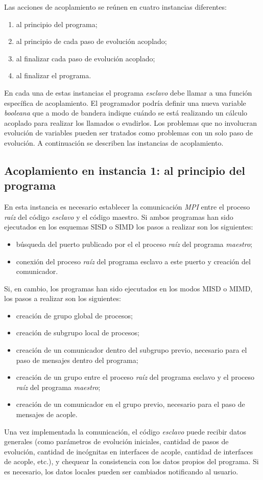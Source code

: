 Las acciones de acoplamiento se reúnen en cuatro instancias diferentes:
\begin{enumerate}
\item al principio del programa;
\item al principio de cada paso de evolución acoplado;
\item al finalizar cada paso de evolución acoplado;
\item al finalizar el programa.
\end{enumerate}
En cada una de estas instancias el programa \textit{esclavo} debe llamar a una función específica de acoplamiento.
El programador podría definir una nueva variable \textit{booleana} que a modo de bandera indique cuándo se está realizando un cálculo acoplado para realizar los llamados o evadirlos.
Los problemas que no involucran evolución de variables pueden ser tratados como problemas con un solo paso de evolución.
A continuación se describen las instancias de acoplamiento.

\subsection*{Acoplamiento en instancia 1: al principio del programa}

En esta instancia es necesario establecer la comunicación \textit{MPI} entre el proceso \textit{raíz} del código \textit{esclavo} y el código maestro.
Si ambos programas han sido ejecutados en los esquemas SISD o SIMD los pasos a realizar son los siguientes:
\begin{itemize}
\item búsqueda del puerto publicado por el el proceso \textit{raíz} del programa \textit{maestro};
\item conexión del proceso \textit{raíz} del programa esclavo a este puerto y creación del comunicador.
\end{itemize}
Si, en cambio, los programas han sido ejecutados en los modos MISD o MIMD, los pasos a realizar son los siguientes:
\begin{itemize}
\item creación de grupo global de procesos;
\item creación de subgrupo local de procesos;
\item creación de un comunicador dentro del subgrupo previo, necesario para el paso de mensajes dentro del programa;
\item creación de un grupo entre el proceso \textit{raíz} del programa esclavo y el proceso \textit{raíz} del programa \textit{maestro};
\item creación de un comunicador en el grupo previo, necesario para el paso de mensajes de acople.
\end{itemize}
Una vez implementada la comunicación, el código \textit{esclavo} puede recibir datos generales 
(como parámetros de evolución iniciales, cantidad de pasos de evolución, cantidad de incógnitas en interfaces de acople, cantidad de interfaces de acople, etc.),
y chequear la consistencia con los datos propios del programa.
Si es necesario, los datos locales pueden ser cambiados notificando al usuario.

